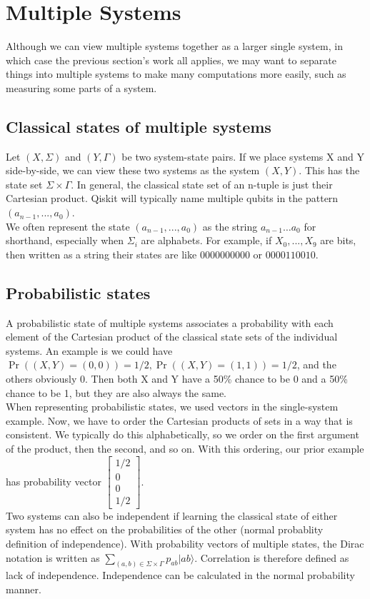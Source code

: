 \documentclass{amsart}
\begin{document}
\section*{Multiple Systems}
Although we can view multiple systems together as a larger single system, in which case the
previous section's work all applies, we may want to separate things into multiple systems to
make many computations more easily, such as measuring some parts of a system. \\
\subsection*{Classical states of multiple systems}
Let $ (X,\Sigma) $ and $ (Y,\Gamma) $ be two system-state pairs. If we place systems X and Y
side-by-side, we can view these two systems as the system $ (X,Y) $. This has the state set
$ \Sigma \times \Gamma $. In general, the classical state set of an n-tuple is just their
Cartesian product. Qiskit will typically name multiple qubits in the pattern
$ (a_{n-1},...,a_0) $. \\
We often represent the state $ (a_{n-1},...,a_0) $ as the string $ a_{n-1}\dots a_0 $ for
shorthand, especially when $ \Sigma_i $ are alphabets. For example, if $ X_0,...,X_9 $ are
bits, then written as a string their states are like $ 0000000000 $ or $ 0000110010 $.
\subsection*{Probabilistic states}
A probabilistic state of multiple systems associates a probability with each element of the
Cartesian product of the classical state sets of the individual systems. An example is we
could have $ \Pr((X,Y)=(0,0)) = 1/2, \Pr((X,Y)=(1,1)) = 1/2 $, and the others obviously 0.
Then both X and Y have a 50\% chance to be 0 and a 50\% chance to be 1, but they are also
always the same. \\
When representing probabilistic states, we used vectors in the single-system example. Now, we
have to order the Cartesian products of sets in a way that is consistent. We typically do this
alphabetically, so we order on the first argument of the product, then the second, and so on.
With this ordering, our prior example has probability vector
$ \begin{bmatrix} 1/2 \\ 0 \\ 0 \\ 1/2 \end{bmatrix} $. \\
Two systems can also be independent if learning the classical state of either system has no
effect on the probabilities of the other (normal probablity definition of independence).
With probability vectors of multiple states, the Dirac notation is written as
$ \sum_{(a,b) \in \Sigma \times \Gamma} p_{ab} |ab\rangle $. Correlation is therefore
defined as lack of independence. Independence can be calculated in the normal probability
manner. \\
\end{document}
